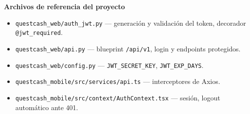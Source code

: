 \documentclass[11pt,letterpaper]{article}
\begin{document}
\vspace{0.8em}
\noindent\textbf{Archivos de referencia del proyecto}
\begin{itemize}[leftmargin=1.4em,itemsep=2pt]
  \item \texttt{questcash\_web/auth\_jwt.py} — generación y validación del token, decorador \texttt{@jwt\_required}.
  \item \texttt{questcash\_web/api.py} — blueprint \texttt{/api/v1}, login y endpoints protegidos.
  \item \texttt{questcash\_web/config.py} — \texttt{JWT\_SECRET\_KEY}, \texttt{JWT\_EXP\_DAYS}.
  \item \texttt{questcash\_mobile/src/services/api.ts} — interceptores de Axios.
  \item \texttt{questcash\_mobile/src/context/AuthContext.tsx} — sesión, logout automático ante 401.
\end{itemize}
\end{document}
